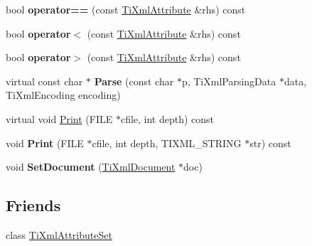 \begin{DoxyCompactItemize}
\item 
\hypertarget{class_ti_xml_attribute_ae48c2a65b520d453914ce4e845d607cf}{
bool {\bfseries operator==} (const \hyperlink{class_ti_xml_attribute}{TiXmlAttribute} \&rhs) const }
\label{class_ti_xml_attribute_ae48c2a65b520d453914ce4e845d607cf}

\item 
\hypertarget{class_ti_xml_attribute_adb8b6f2cad5948e73e383182e7ce10de}{
bool {\bfseries operator$<$} (const \hyperlink{class_ti_xml_attribute}{TiXmlAttribute} \&rhs) const }
\label{class_ti_xml_attribute_adb8b6f2cad5948e73e383182e7ce10de}

\item 
\hypertarget{class_ti_xml_attribute_a867562769ef9778c1690cd373246b05b}{
bool {\bfseries operator$>$} (const \hyperlink{class_ti_xml_attribute}{TiXmlAttribute} \&rhs) const }
\label{class_ti_xml_attribute_a867562769ef9778c1690cd373246b05b}

\item 
\hypertarget{class_ti_xml_attribute_a1437efc74bb8d49da5290772202b5e68}{
virtual const char $\ast$ {\bfseries Parse} (const char $\ast$p, TiXmlParsingData $\ast$data, TiXmlEncoding encoding)}
\label{class_ti_xml_attribute_a1437efc74bb8d49da5290772202b5e68}

\item 
virtual void \hyperlink{class_ti_xml_attribute_acc04956c1d5c4c31fe74f7a7528d109a}{Print} (FILE $\ast$cfile, int depth) const 
\item 
\hypertarget{class_ti_xml_attribute_a19e6b6862a80b188571c47947e88d030}{
void {\bfseries Print} (FILE $\ast$cfile, int depth, TIXML\_\-STRING $\ast$str) const }
\label{class_ti_xml_attribute_a19e6b6862a80b188571c47947e88d030}

\item 
\hypertarget{class_ti_xml_attribute_ac12a94d4548302afb12f488ba101f7d1}{
void {\bfseries SetDocument} (\hyperlink{class_ti_xml_document}{TiXmlDocument} $\ast$doc)}
\label{class_ti_xml_attribute_ac12a94d4548302afb12f488ba101f7d1}

\end{DoxyCompactItemize}
\subsection*{Friends}
\begin{DoxyCompactItemize}
\item 
\hypertarget{class_ti_xml_attribute_a35a7b7f89f708527677d5078d41ce0bf}{
class \hyperlink{class_ti_xml_attribute_a35a7b7f89f708527677d5078d41ce0bf}{TiXmlAttributeSet}}
\label{class_ti_xml_attribute_a35a7b7f89f708527677d5078d41ce0bf}

\end{DoxyCompactItemize}



